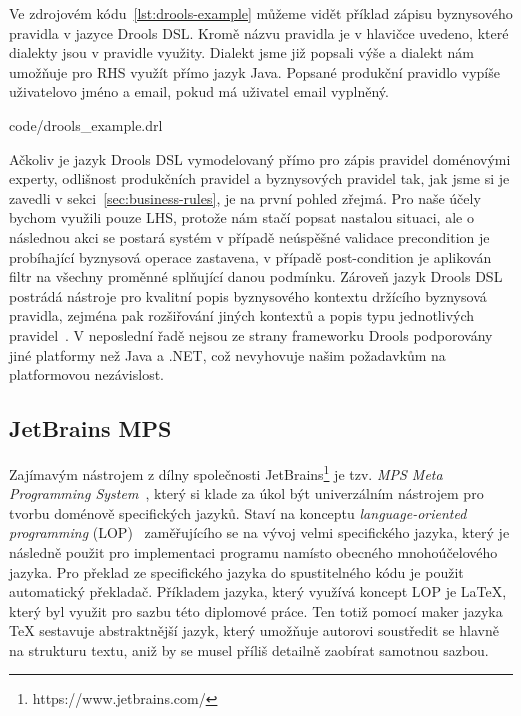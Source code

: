 Ve zdrojovém kódu~\ref{lst:drools-example} můžeme vidět příklad zápisu
byznysového pravidla v jazyce Drools DSL. Kromě názvu pravidla je v hlavičce
uvedeno, které dialekty jsou v pravidle využity. Dialekt  jsme již popsali výše a
dialekt  nám umožňuje pro \gls{RHS} využít přímo jazyk Java. Popsané produkční pravidlo
vypíše uživatelovo jméno a email, pokud má uživatel email vyplněný.


{code/drools_example.drl}

Ačkoliv je jazyk Drools \gls{DSL} vymodelovaný přímo pro zápis pravidel doménovými experty,
odlišnost produkčních pravidel a byznysových pravidel tak, jak jsme si je zavedli v sekci~\ref{sec:business-rules},
je na první pohled zřejmá. Pro naše účely bychom využili pouze \gls{LHS}, protože nám stačí
popsat nastalou situaci, ale o následnou akci se postará systém \textendash\xspace v případě
neúspěšné validace precondition je probíhající byznysová operace zastavena, v případě post-condition je aplikován filtr
na všechny proměnné splňující danou podmínku. Zároveň jazyk Drools \gls{DSL} postrádá
nástroje pro kvalitní popis byznysového kontextu držícího byznysová pravidla,
zejména pak rozšiřování jiných kontextů a popis typu jednotlivých pravidel~\cite{cemus2017automated}.
V neposlední řadě nejsou ze strany frameworku Drools podporovány jiné platformy než
Java a .NET, což nevyhovuje našim požadavkům na platformovou nezávislost.

\subsection{JetBrains MPS}

Zajímavým nástrojem z dílny společnosti JetBrains\footnote{https://www.jetbrains.com/}
je tzv. \textit{MPS \textendash\xspace Meta Programming System}~\cite{jetbrainsmps}, který si klade za úkol být univerzálním
nástrojem pro tvorbu doménově specifických jazyků. Staví na konceptu \textit{language-oriented
programming} (\gls{LOP})~\cite{ward1994language} zaměřujícího se na vývoj velmi specifického jazyka,
který je následně použit pro implementaci programu namísto obecného mnohoúčelového jazyka. Pro překlad
ze specifického jazyka do spustitelného kódu je použit automatický překladač. Příkladem jazyka, který využívá koncept \gls{LOP}
je \LaTeX\xspace, který byl využit pro sazbu této diplomové práce. Ten totiž pomocí maker jazyka \TeX\xspace
sestavuje abstraktnější jazyk, který umožňuje autorovi soustředit se hlavně na strukturu textu, aniž by
se musel příliš detailně zaobírat samotnou sazbou.

